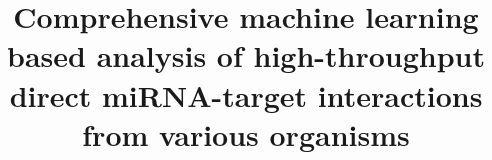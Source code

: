 \documentclass{bmcart}
\begin{document}
\begin{frontmatter}

\begin{fmbox}



\title{Comprehensive machine learning based analysis of high-throughput direct miRNA-target interactions from various organisms}



\author[
   addressref={aff1},                   %
   email={benorgi@post.bgu.ac.il}   %
]{ }

\author[
 addressref={aff1},
   email={vaksler@post.bgu.ac.il}
]{ }



\end{fmbox}
\end{frontmatter}
\end{document}
